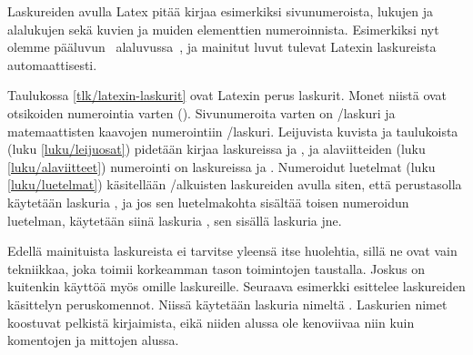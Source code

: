 Laskureiden avulla Latex pitää kirjaa esimerkiksi sivunumeroista,
lukujen ja alalukujen sekä kuvien ja muiden elementtien numeroinnista.
Esimerkiksi nyt olemme pääluvun~
alaluvussa~, ja mainitut luvut tulevat Latexin
laskureista automaattisesti.


Taulukossa \ref{tlk/latexin-laskurit} ovat Latexin perus laskurit. Monet
niistä ovat otsikoiden numerointia varten ().
Sivunumeroita varten on \-/laskuri ja matemaattisten
kaavojen numerointiin \-/laskuri. Leijuvista kuvista
ja taulukoista (luku \ref{luku/leijuosat}) pidetään kirjaa laskureissa
 ja , ja alaviitteiden (luku
\ref{luku/alaviitteet}) numerointi on laskureissa  ja
. Numeroidut luetelmat (luku \ref{luku/luetelmat})
käsitellään \-/alkuisten laskureiden avulla siten, että
perustasolla käytetään laskuria , ja jos sen
luetelmakohta sisältää toisen numeroidun luetelman, käytetään siinä
laskuria , sen sisällä laskuria  jne.

Edellä mainituista laskureista ei tarvitse yleensä itse huolehtia, sillä
ne ovat vain tekniikkaa, joka toimii korkeamman tason toimintojen
taustalla. Joskus on kuitenkin käyttöä myös omille laskureille. Seuraava
esimerkki esittelee laskureiden käsittelyn peruskomennot. Niissä
käytetään laskuria nimeltä . Laskurien nimet koostuvat
pelkistä kirjaimista, eikä niiden alussa ole kenoviivaa niin kuin
komentojen ja mittojen alussa.

